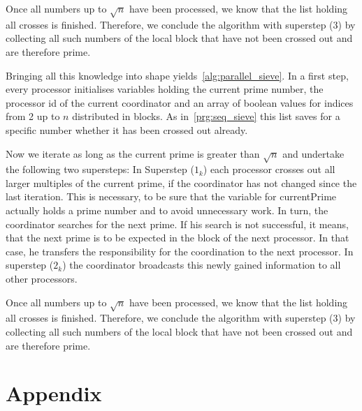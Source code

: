 \documentclass[a4paper,12pt]{article}
\begin{document}
Once all numbers up to $\sqrt{n}$ have been processed, we know that the list holding all crosses is finished.
Therefore, we conclude the algorithm with superstep ($3$) by collecting all such numbers of the local block that have not been crossed out and are therefore prime.



Bringing all this knowledge into shape yields~\autoref{alg:parallel_sieve}.
In a first step, every processor initialises variables holding the current prime number, the processor id of the current coordinator and an array of boolean values for indices from 2 up to $n$ distributed in blocks.
As in~\autoref{prg:seq_sieve} this list saves for a specific number whether it has been crossed out already.

Now we iterate as long as the current prime is greater than $\sqrt{n}$ and undertake the following two supersteps:
In Superstep ($1_k$) each processor crosses out all larger multiples of the current prime, if the coordinator has not changed since the last iteration.
This is necessary, to be sure that the variable for currentPrime actually holds a prime number and to avoid unnecessary work.
In turn, the coordinator searches for the next prime.
If his search is not successful, it means, that the next prime is to be expected in the block of the next processor.
In that case, he transfers the responsibility for the coordination to the next processor.
In superstep ($2_k$) the coordinator broadcasts this newly gained information to all other processors.
 
Once all numbers up to $\sqrt{n}$ have been processed, we know that the list holding all crosses is finished.
Therefore, we conclude the algorithm with superstep ($3$) by collecting all such numbers of the local block that have not been crossed out and are therefore prime.


\pagebreak
\appendix
\section{Appendix}
\end{document}
